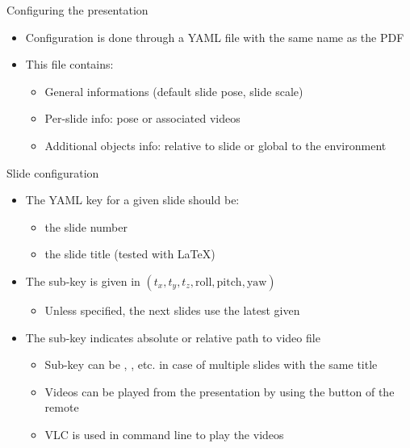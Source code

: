 \documentclass{ecnbeamer}
\begin{document}
\begin{frame}{Configuring the presentation}
 \begin{itemize}
  \item Configuration is done through a YAML file with the same name as the PDF\vfill
  \item This file contains:\vfill
  \begin{itemize}[<+->]
   \item General informations (default slide pose, slide scale)\vfill
   \item Per-slide info: pose or associated videos\vfill
   \item Additional objects info: relative to slide or global to the environment
  \end{itemize}
 \end{itemize}
\end{frame}

\begin{frame}{Slide configuration}
 \begin{itemize}
  \item The YAML key for a given slide should be:
  \begin{itemize}
   \item the slide number
   \item the slide title (tested with LaTeX)
  \end{itemize}\vfill
  \item The  sub-key is given in $(t_x, t_y, t_z, \text{roll}, \text{pitch}, \text{yaw})$
  \begin{itemize}
   \item Unless specified, the next slides use the latest given 
  \end{itemize}\vfill
  \item The  sub-key indicates absolute or relative path to video file
  \begin{itemize}
   \item Sub-key can be , , etc. in case of multiple slides with the same title
   \item Videos can be played from the presentation by using the  button of the remote
   \item VLC is used in command line to play the videos
  \end{itemize}
 \end{itemize}
\end{frame}
\end{document}
